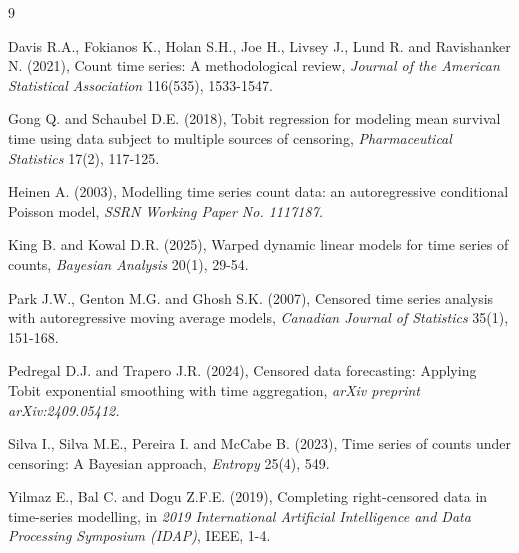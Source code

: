 \documentclass[twoside]{article}
\begin{document}
\clearpage
\begin{thebibliography}{9}

Davis R.A., Fokianos K., Holan S.H., Joe H., Livsey J., Lund R. and Ravishanker N. (2021), Count time series: A methodological review, {\it Journal of the American Statistical Association} 116(535), 1533-1547.

Gong Q. and Schaubel D.E. (2018), Tobit regression for modeling mean survival time using data subject to multiple sources of censoring, {\it Pharmaceutical Statistics} 17(2), 117-125.

Heinen A. (2003), Modelling time series count data: an autoregressive conditional Poisson model, {\it SSRN Working Paper No. 1117187.}

King B. and Kowal D.R. (2025), Warped dynamic linear models for time series of counts, {\it Bayesian Analysis} 20(1), 29-54.

Park J.W., Genton M.G. and Ghosh S.K. (2007), Censored time series analysis with autoregressive moving average models, {\it Canadian Journal of Statistics} 35(1), 151-168.

Pedregal D.J. and Trapero J.R. (2024), Censored data forecasting: Applying Tobit exponential smoothing with time aggregation, {\it arXiv preprint arXiv:2409.05412.}

Silva I., Silva M.E., Pereira I. and McCabe B. (2023), Time series of counts under censoring: A Bayesian approach, {\it Entropy} 25(4), 549.

Yilmaz E., Bal C. and Dogu Z.F.E. (2019), Completing right-censored data in time-series modelling, in {\it 2019 International Artificial Intelligence and Data Processing Symposium (IDAP)}, IEEE, 1-4.
\end{thebibliography}
 
\end{document}

